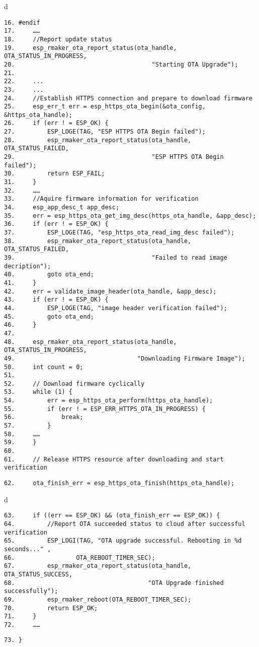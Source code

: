 \documentclass[a4paper,12pt]{book}
\begin{document}
\begin{codebloc}
\begin{tabular}{d}
\vspace{2pt}
\begin{verbatim}
16. #endif
17.     ……
18.     //Report update status
19.     esp_rmaker_ota_report_status(ota_handle, OTA_STATUS_IN_PROGRESS,
20.                                      "Starting OTA Upgrade");
21.
22.     ...
23.     ...
24.     //Establish HTTPS connection and prepare to download firmware
25.     esp_err_t err = esp_https_ota_begin(&ota_config, &https_ota_handle);
26.     if (err ! = ESP_OK) {
27.         ESP_LOGE(TAG, "ESP HTTPS OTA Begin failed");
28.         esp_rmaker_ota_report_status(ota_handle, OTA_STATUS_FAILED,
29.                                      "ESP HTTPS OTA Begin failed");
30.         return ESP_FAIL;
31.     }
32.     ……
33.     //Aquire firmware information for verification
34.     esp_app_desc_t app_desc;
35.     err = esp_https_ota_get_img_desc(https_ota_handle, &app_desc);
36.     if (err ! = ESP_OK) {
37.         ESP_LOGE(TAG, "esp_https_ota_read_img_desc failed");
38.         esp_rmaker_ota_report_status(ota_handle, OTA_STATUS_FAILED,
39.                                      "Failed to read image decription");
40.         goto ota_end;
41.     }
42.     err = validate_image_header(ota_handle, &app_desc);
43.     if (err ! = ESP_OK) {
44.         ESP_LOGE(TAG, "image header verification failed");
45.         goto ota_end;
46.     }
47.
48.     esp_rmaker_ota_report_status(ota_handle, OTA_STATUS_IN_PROGRESS,
49.                                  "Downloading Firmware Image");
50.     int count = 0;
51.
52.     // Download firmware cyclically
53.     while (1) {
54.         err = esp_https_ota_perform(https_ota_handle);
55.         if (err ! = ESP_ERR_HTTPS_OTA_IN_PROGRESS) {
56.             break;
57.         }
58.     ……
59.     }
60.
61.     // Release HTTPS resource after downloading and start verification
\end{verbatim}
\verb|62.     ota_finish_err = esp_https_ota_finish(https_ota_handle);|
\end{tabular}
\end{codebloc}

\begin{codebloc}
\begin{tabular}{d}
\vspace{2pt}
\begin{verbatim}
63.     if ((err == ESP_OK) && (ota_finish_err == ESP_OK)) {
64.         //Report OTA succeeded status to cloud after successful verification
65.         ESP_LOGI(TAG, "OTA upgrade successful. Rebooting in %d seconds..." ,
66.                 OTA_REBOOT_TIMER_SEC);
67.         esp_rmaker_ota_report_status(ota_handle, OTA_STATUS_SUCCESS,
68.                                     "OTA Upgrade finished successfully");
69.         esp_rmaker_reboot(OTA_REBOOT_TIMER_SEC);
70.         return ESP_OK;
71.     } 
72.     ……
\end{verbatim}
\verb|73. }|
\end{tabular}
\end{codebloc}
\end{document}
